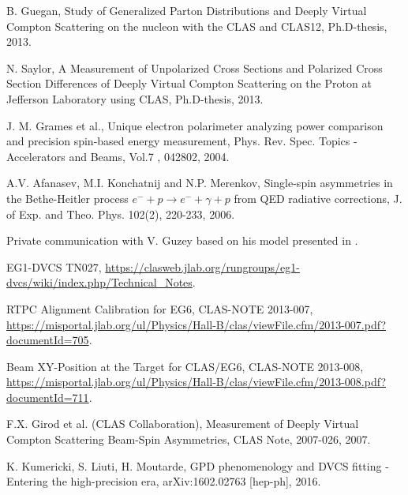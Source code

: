 \begin{thebibliography}{99}
B. Guegan, Study of Generalized Parton Distributions and Deeply Virtual Compton Scattering on the nucleon with the CLAS and CLAS12, Ph.D-thesis, 2013.

N. Saylor, A Measurement of Unpolarized Cross Sections and Polarized Cross Section Differences of Deeply Virtual Compton Scattering on the Proton at Jefferson Laboratory using CLAS, Ph.D-thesis, 2013.


J. M. Grames et al., Unique electron polarimeter analyzing power comparison and precision spin-based energy measurement, Phys. Rev. Spec. Topics - Accelerators and Beams, Vol.7 , 042802, 2004.

A.V. Afanasev, M.I. Konchatnij and N.P. Merenkov, Single-spin asymmetries in the Bethe-Heitler process $e^{-} + p \rightarrow  e^{-} + \gamma + p$ from QED radiative corrections, J. of Exp. and Theo. Phys. 102(2), 220-233, 2006.

Private communication with V. Guzey based on his model presented in \cite{EMC_vadim_3}. 


EG1-DVCS TN027, \url{https://clasweb.jlab.org/rungroups/eg1-dvcs/wiki/index.php/Technical_Notes}.

RTPC Alignment Calibration for EG6, CLAS-NOTE 2013-007, \url{https://misportal.jlab.org/ul/Physics/Hall-B/clas/viewFile.cfm/2013-007.pdf?documentId=705}.

Beam XY-Position at the Target for CLAS/EG6, CLAS-NOTE 2013-008, \url{https://misportal.jlab.org/ul/Physics/Hall-B/clas/viewFile.cfm/2013-008.pdf?documentId=711}.


F.X. Girod et al. (CLAS Collaboration), Measurement of Deeply Virtual Compton 
Scattering Beam-Spin Asymmetries, CLAS Note, 2007-026, 2007.

K. Kumericki, S. Liuti, H. Moutarde, GPD phenomenology and DVCS fitting - 
Entering the high-precision era, arXiv:1602.02763 [hep-ph], 2016.

\end{thebibliography}
